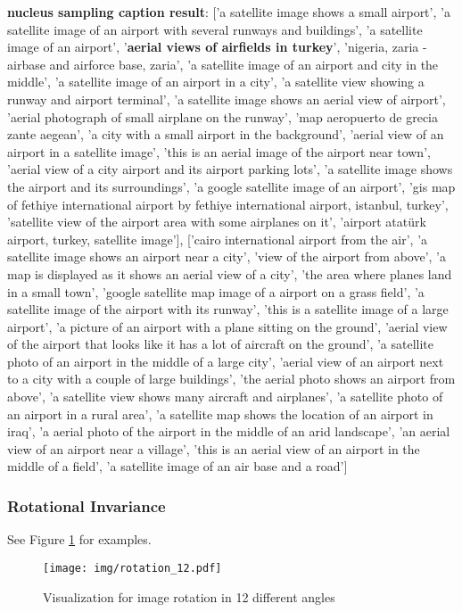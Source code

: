 \documentclass[journal]{IEEEtran}
\begin{document}
\textbf{nucleus sampling caption result}: ['a satellite image shows a small airport', 'a satellite image of an airport with several runways and buildings', 'a satellite image of an airport', '\textbf{aerial views of airfields in turkey}', 'nigeria, zaria - airbase and airforce base, zaria', 'a satellite image of an airport and city in the middle', 'a satellite image of an airport in a city', 'a satellite view showing a runway and airport terminal', 'a satellite image shows an aerial view of airport', 'aerial photograph of small airplane on the runway', 'map aeropuerto de grecia zante aegean', 'a city with a small airport in the background', 'aerial view of an airport in a satellite image', 'this is an aerial image of the airport near town', 'aerial view of a city airport and its airport parking lots', 'a satellite image shows the airport and its surroundings', 'a google satellite image of an airport', 'gis map of fethiye international airport by fethiye international airport, istanbul, turkey', 'satellite view of the airport area with some airplanes on it', 'airport atatürk airport, turkey, satellite image'], ['cairo international airport from the air', 'a satellite image shows an airport near a city', 'view of the airport from above', 'a map is displayed as it shows an aerial view of a city', 'the area where planes land in a small town', 'google satellite map image of a airport on a grass field', 'a satellite image of the airport with its runway', 'this is a satellite image of a large airport', 'a picture of an airport with a plane sitting on the ground', 'aerial view of the airport that looks like it has a lot of aircraft on the ground', 'a satellite photo of an airport in the middle of a large city', 'aerial view of an airport next to a city with a couple of large buildings', 'the aerial photo shows an airport from above', 'a satellite view shows many aircraft and airplanes', 'a satellite photo of an airport in a rural area', 'a satellite map shows the location of an airport in iraq', 'a aerial photo of the airport in the middle of an arid landscape', 'an aerial view of an airport near a village', 'this is an aerial view of an airport in the middle of a field', 'a satellite image of an air base and a road']


\subsubsection{Rotational Invariance}
See Figure \ref{fig:rotation} for examples.
\label{appendix:rotational_invariance}
\begin{figure}
    \centering
    \texttt{[image: img/rotation\_12.pdf]}
    \caption{Visualization for image rotation in 12 different angles}
    \label{fig:rotation}
\end{figure}
\end{document}
